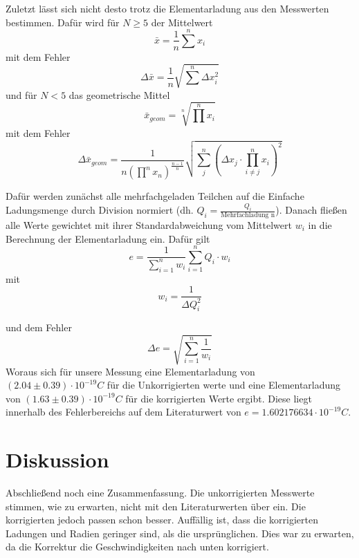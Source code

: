 \documentclass{scrartcl}
\begin{document}
            Zuletzt lässt sich nicht desto trotz die Elementarladung aus den Messwerten bestimmen. Dafür wird für $N \geq 5$
            der Mittelwert 
            \begin{equation}
                \bar{x} = \frac{1}{n} \sum^n x_i
            \end{equation} 
            mit dem Fehler
            \begin{equation}
                \Delta \bar{x} = \frac{1}{n} \sqrt{\sum^n \Delta x_i^2} 
            \end{equation}
            und für $N < 5$ das geometrische Mittel
            \begin{equation}
                \bar{x}_{geom} = \sqrt[n]{\prod^n x_i}
            \end{equation}
            mit dem Fehler
            \begin{equation}
                \Delta \bar{x}_{geom} = \frac{1}{n (\prod^n x_n)^{\frac{n-1}{n}}} \sqrt{\sum_j^n (\Delta x_j \cdot \prod_{i\neq j}^n x_i)^2}
            \end{equation}
            
            Dafür werden zunächst
            alle mehrfachgeladen Teilchen auf die Einfache Ladungsmenge durch Division normiert (dh. $Q_i = \frac{Q_i}{\text{Mehrfachladung n}}$).
            Danach fließen alle Werte gewichtet mit ihrer Standardabweichung vom Mittelwert $w_i$ in die Berechnung der
            Elementarladung ein. Dafür gilt
            \begin{equation}
                e = \frac{1}{\sum_{i=1}^n w_i} \sum_{i=1}^n Q_i \cdot w_i 
            \end{equation}
            mit 
            \begin{equation}
                w_i = \frac{1}{\Delta Q_i^2}
            \end{equation}

            und dem Fehler
            \begin{equation}
                \Delta e = \sqrt{\sum_{i=1}^n\frac{1}{w_i}}
            \end{equation}
            Woraus sich für unsere Messung eine Elementarladung von $(2.04\pm 0.39)\cdot 10^{-19} C$ für die Unkorrigierten werte und eine
            Elementarladung von $(1.63\pm 0.39)\cdot 10^{-19}C$ für die korrigierten Werte ergibt.
            Diese liegt innerhalb des Fehlerbereichs auf dem Literaturwert von $e=1.602176634\cdot 10^{-19}C$.
            \section{Diskussion}
                Abschließend noch eine Zusammenfassung. Die unkorrigierten Messwerte stimmen, wie zu erwarten, 
                nicht mit den Literaturwerten über ein. Die korrigierten jedoch passen schon besser. 
                Auffällig ist, dass die korrigierten Ladungen und Radien geringer sind, als die ursprünglichen. 
                Dies war zu erwarten, da die Korrektur die Geschwindigkeiten nach unten korrigiert. 
            
\end{document}
